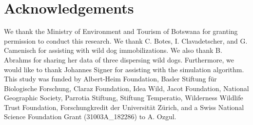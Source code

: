\documentclass[abstract=on,10pt,a4paper,bibliography=totocnumbered]{article}
\begin{document}
\section{Acknowledgements}
We thank the Ministry of Environment and Tourism of Botswana for granting
permission to conduct this research. We thank C. Botes, I. Clavadetscher, and G.
Camenisch for assisting with wild dog immobilizations. We also thank B. Abrahms
for sharing her data of three dispersing wild dogs. Furthermore, we would like
to thank Johannes Signer for assisting with the simulation algorithm. This study
was funded by Albert-Heim Foundation, Basler Stiftung für Biologische Forschung,
Claraz Foundation, Idea Wild, Jacot Foundation, National Geographic Society,
Parrotia Stiftung, Stiftung Temperatio, Wilderness Wildlife Trust Foundation,
Forschungkredit der Universität Zürich, and a Swiss National Science Foundation
Grant (31003A\_182286) to A. Ozgul.

\newpage
\begingroup
\singlespacing


\endgroup
\end{document}
